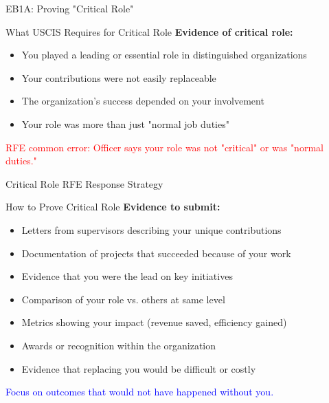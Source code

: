 \documentclass[11pt]{beamer}
\begin{document}
	
	\begin{frame}{EB1A: Proving "Critical Role"}
		\scriptsize
		\begin{block}{What USCIS Requires for Critical Role}
			\textbf{Evidence of critical role:}
			\begin{itemize}
				\item You played a leading or essential role in distinguished organizations
				\item Your contributions were not easily replaceable
				\item The organization's success depended on your involvement
				\item Your role was more than just "normal job duties"
			\end{itemize}
			\textcolor{red}{RFE common error: Officer says your role was not "critical" or was "normal duties."}
		\end{block}
	\end{frame}
	
	\begin{frame}{Critical Role RFE Response Strategy}
		\scriptsize
		\begin{block}{How to Prove Critical Role}
			\textbf{Evidence to submit:}
			\begin{itemize}
				\item Letters from supervisors describing your unique contributions
				\item Documentation of projects that succeeded because of your work
				\item Evidence that you were the lead on key initiatives
				\item Comparison of your role vs. others at same level
				\item Metrics showing your impact (revenue saved, efficiency gained)
				\item Awards or recognition within the organization
				\item Evidence that replacing you would be difficult or costly
			\end{itemize}
			\textcolor{blue}{Focus on outcomes that would not have happened without you.}
		\end{block}
	\end{frame}
	
	
\end{document}
